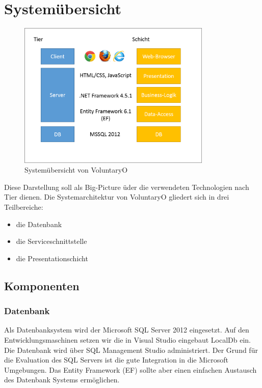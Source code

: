 \chapter{Systemübersicht}
	\begin{figure}
  		\vspace{-25pt}
	  	\begin{center}
    		\includegraphics[height=7cm]{content/architekturdokumentation/images/systemarchitektur.png}
	  	\end{center}
  		\vspace{-20pt}
	 	\caption{Systemübersicht von VoluntaryO}
	\end{figure}
    Diese Darstellung soll als Big-Picture üder die verwendeten Technologien nach Tier dienen.
	Die Systemarchitektur von VoluntaryO gliedert sich in drei Teilbereiche: 
	\\\begin{itemize}
		\item die Datenbank
		\item die Serviceschnittstelle
		\item die Presentationschicht
	\end{itemize}
  	\vspace{3cm}

	\section{Komponenten}
		\subsection{Datenbank}
		Als Datenbanksystem wird der Microsoft SQL Server 2012 eingesetzt. Auf den Entwicklungsmaschinen setzen wir die in Visual Studio eingebaut LocalDb ein. Die Datenbank wird über SQL Management Studio administriert. Der Grund für die Evaluation des SQL Servers ist die gute Integration in die Microsoft Umgebungen. Das Entity Framework (EF) sollte aber einen einfachen Austausch des Datenbank Systems ermöglichen.
